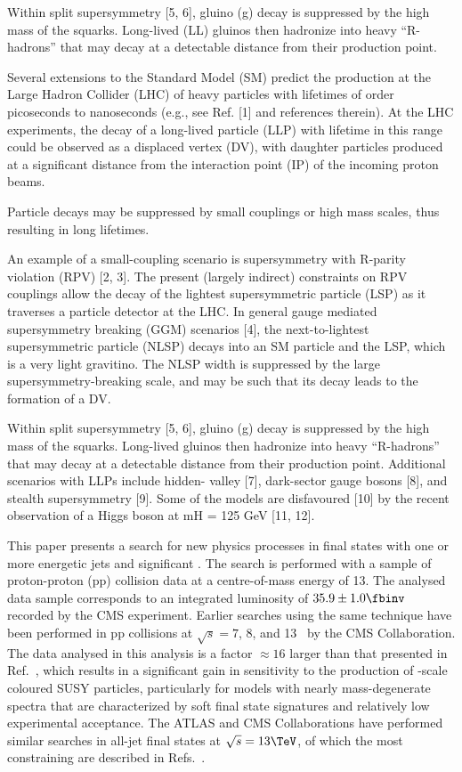 
Within split supersymmetry [5, 6], gluino (g) decay is suppressed by
the high mass of the squarks. Long-lived (LL) gluinos then hadronize
into heavy ``R-hadrons'' that may decay at a detectable distance from
their production point.

Several extensions to the Standard Model (SM) predict the production
at the Large Hadron Collider (LHC) of heavy particles with lifetimes
of order picoseconds to nanoseconds (e.g., see Ref. [1] and references
therein). At the LHC experiments, the decay of a long-lived particle
(LLP) with lifetime in this range could be observed as a displaced
vertex (DV), with daughter particles produced at a significant
distance from the interaction point (IP) of the incoming proton
beams. 

Particle decays may be suppressed by small couplings or high mass
scales, thus resulting in long lifetimes. 

An example of a small-coupling scenario is supersymmetry with R-parity
violation (RPV) [2, 3]. The present (largely indirect) constraints on
RPV couplings allow the decay of the lightest supersymmetric particle
(LSP) as it traverses a particle detector at the LHC. In general
gauge mediated supersymmetry breaking (GGM) scenarios [4], the
next-to-lightest supersymmetric particle (NLSP) decays into an SM
particle and the LSP, which is a very light gravitino. The NLSP width
is suppressed by the large supersymmetry-breaking scale, and may be
such that its decay leads to the formation of a DV. 

Within split supersymmetry [5, 6], gluino (g) decay is suppressed by
the high mass of the squarks. Long-lived gluinos then hadronize into
heavy ``R-hadrons'' that may decay at a detectable distance from their
production point. Additional scenarios with LLPs include hidden-
valley [7], dark-sector gauge bosons [8], and stealth supersymmetry
[9]. Some of the models are disfavoured [10] by the recent observation
of a Higgs boson at mH = 125 GeV [11, 12].


This paper presents a search for new physics processes in final states
with one or more energetic jets and significant \ptvecmiss. The search
is performed with a sample of proton-proton (pp) collision data at a
centre-of-mass energy of 13\TeV. The analysed data sample corresponds
to an integrated luminosity of $35.9 \pm 1.0 \fbinv$ recorded by the
CMS experiment. Earlier searches using the same technique have been
performed in pp collisions at $\sqrt{s} = 7$, 8, and
13\TeV~\cite{RA1Paper, RA1Paper2011, RA1Paper2011FULL, RA1Paper2012,
  RA1Parked, Khachatryan:2016dvc} by the CMS Collaboration. The data
analysed in this analysis is a factor ${\approx}16$ larger than that
presented in Ref.~\cite{Khachatryan:2016dvc}, which results in a
significant gain in sensitivity to the production of \TeV-scale
coloured SUSY particles, particularly for models with nearly
mass-degenerate spectra that are characterized by soft final state
signatures and relatively low experimental acceptance. The ATLAS and
CMS Collaborations have performed similar searches in all-jet final
states at $\sqrt{s} = 13\TeV$, of which the most constraining are
described in Refs.~\cite{}.

